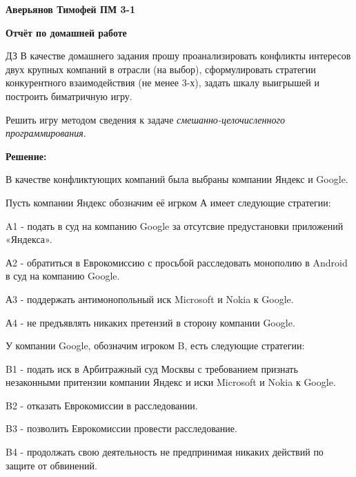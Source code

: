 \documentclass[12pt,a4paper]{article}
\author{Аверьянов Тимофей}
\begin{document}
\begin{center}
\textbf{Аверьянов Тимофей ПМ 3-1}

\textbf{Отчёт по домашней работе}
\end{center}
$\displaystyle \boxed{\text{ДЗ}}$ В качестве домашнего задания прошу проанализировать конфликты интересов двух крупных компаний в отрасли (на выбор), сформулировать стратегии конкурентного взаимодействия (не менее 3-х), задать шкалу выигрышей и построить биматричную игру.

Решить игру методом сведения к задаче \textit{смешанно-целочисленного программирования}.

\textbf{Решение:}

В качестве конфликтующих компаний была выбраны компании \textcolor[rgb]{0.29,0.56,0.89}{Яндекс} и \textcolor[rgb]{0.82,0.01,0.11}{Google}.

Пусть компании \textcolor[rgb]{0.29,0.56,0.89}{Яндекс} обозначим её игрком \textcolor[rgb]{0.29,0.56,0.89}{А} имеет следующие стратегии:

\textcolor[rgb]{0.29,0.56,0.89}{A1} - подать в суд на компанию \textcolor[rgb]{0.82,0.01,0.11}{Google} за отсутсвие предустановки приложений \textcolor[rgb]{0.29,0.56,0.89}{«Яндекса»}.

\textcolor[rgb]{0.29,0.56,0.89}{А2} - обратиться в Еврокомиссию с просьбой расследовать монополию в Android в суд на компанию \textcolor[rgb]{0.82,0.01,0.11}{Google}.

\textcolor[rgb]{0.29,0.56,0.89}{А3} - поддержать антимонопольный иск Microsoft и Nokia к \textcolor[rgb]{0.82,0.01,0.11}{Google}.

\textcolor[rgb]{0.29,0.56,0.89}{А4} - не предъявлять никаких претензий в сторону компании \textcolor[rgb]{0.82,0.01,0.11}{Google}.

У компании \textcolor[rgb]{0.82,0.01,0.11}{Google}, обозначим игроком \textcolor[rgb]{0.82,0.01,0.11}{B}, есть следующие стратегии:

\textcolor[rgb]{0.82,0.01,0.11}{B1} - подать иск в Арбитражный суд Москвы с требованием признать незаконными притензии компании \textcolor[rgb]{0.29,0.56,0.89}{Яндекс} и иски Microsoft и Nokia к \textcolor[rgb]{0.82,0.01,0.11}{Google}.

\textcolor[rgb]{0.82,0.01,0.11}{B2} - отказать Еврокомиссии в расследовании.

\textcolor[rgb]{0.82,0.01,0.11}{B3} - позволить Еврокомиссии провести расследование.

\textcolor[rgb]{0.82,0.01,0.11}{B4} - продолжать свою деятельность не предпринимая никаких действий по защите от обвинений.
\end{document}
